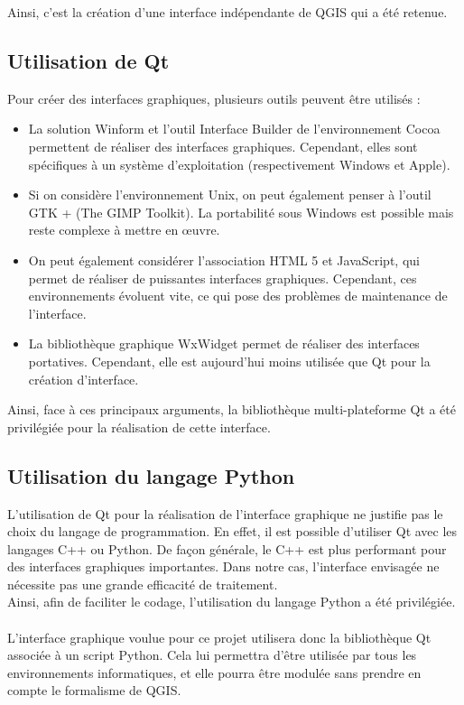 Ainsi, c’est la création d’une interface indépendante de QGIS qui a été retenue.

\subsection{Utilisation de Qt}

\noindent Pour créer des interfaces graphiques, plusieurs outils peuvent être utilisés :
\begin{itemize}[label=$\rightarrow$]
	\item La solution Winform et l’outil Interface Builder de l’environnement Cocoa permettent de réaliser des interfaces graphiques.  Cependant, elles sont spécifiques à un système d’exploitation (respectivement Windows et Apple).  
	\item Si on considère l’environnement Unix, on peut également penser à l’outil GTK + (The GIMP Toolkit). La portabilité sous Windows est possible mais reste complexe à mettre en œuvre.
	\item On peut également considérer l’association HTML 5 et JavaScript, qui permet de réaliser de puissantes interfaces graphiques. Cependant, ces environnements évoluent vite, ce qui pose des problèmes de maintenance de l’interface.
	\item La bibliothèque graphique WxWidget permet de réaliser des interfaces portatives. Cependant, elle est aujourd’hui moins utilisée que Qt pour la création d’interface.
\end{itemize}

Ainsi, face à ces principaux arguments, la bibliothèque multi-plateforme Qt a été privilégiée pour la réalisation de cette interface.

\subsection{Utilisation du langage Python}

L'utilisation de Qt pour la réalisation de l'interface graphique ne justifie pas le choix du langage de programmation. En effet, il est possible d'utiliser Qt avec les langages C++ ou Python. De façon générale, le C++ est plus performant pour des interfaces graphiques importantes. Dans notre cas, l'interface envisagée ne nécessite pas une grande efficacité de traitement. \\

Ainsi, afin de faciliter le codage, l'utilisation du langage Python a été privilégiée.\\\\

L'interface graphique voulue pour ce projet utilisera donc la bibliothèque Qt associée à un script Python. Cela lui permettra d'être utilisée par tous les environnements informatiques, et elle pourra être modulée sans prendre en compte le formalisme de QGIS. 


	
